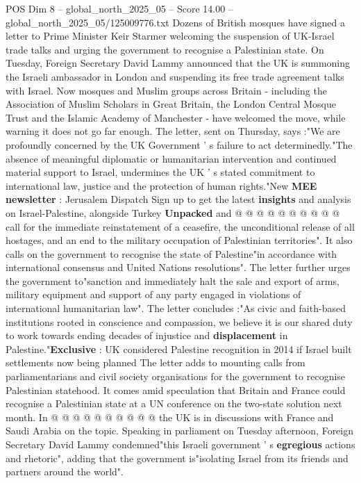 \begin{textsample}{POS Dim 8 – global\_north\_2025\_05 – Score 14.00 – global\_north\_2025\_05/125009776.txt}  \label{ex:f8_pos_033}
Dozens of British mosques have signed a letter to Prime Minister Keir Starmer welcoming the suspension of UK-Israel trade talks and urging the government to recognise a Palestinian state.
On Tuesday, Foreign Secretary David Lammy announced that the UK is summoning the Israeli ambassador in London and suspending its free trade agreement talks with Israel.
Now mosques and Muslim groups across Britain - including the Association of Muslim Scholars in Great Britain, the London Central Mosque Trust and the Islamic Academy of Manchester - have welcomed the move, while warning it does not go far enough.
The letter, sent on Thursday, says :"We are profoundly concerned by the UK Government ' s failure to act determinedly."The absence of meaningful diplomatic or humanitarian intervention and continued material support to Israel, undermines the UK ' s stated commitment to international law, justice and the protection of human rights."New \textbf{MEE} \textbf{newsletter} : Jerusalem Dispatch Sign up to get the latest \textbf{insights} and analysis on Israel-Palestine, alongside Turkey \textbf{Unpacked} and @ @ @ @ @ @ @ @ @ @ call for the immediate reinstatement of a ceasefire, the unconditional release of all hostages, and an end to the military occupation of Palestinian territories".
It also calls on the government to recognise the state of Palestine"in accordance with international consensus and United Nations resolutions".
The letter further urges the government to"sanction and immediately halt the sale and export of arms, military equipment and support of any party engaged in violations of international humanitarian law".
The letter concludes :"As civic and faith-based institutions rooted in conscience and compassion, we believe it is our shared duty to work towards ending decades of injustice and \textbf{displacement} in Palestine."\textbf{Exclusive} : UK considered Palestine recognition in 2014 if Israel built settlements now being planned The letter adds to mounting calls from parliamentarians and civil society organisations for the government to recognise Palestinian statehood.
It comes amid speculation that Britain and France could recognise a Palestinian state at a UN conference on the two-state solution next month.
In @ @ @ @ @ @ @ @ @ @ the UK is in discussions with France and Saudi Arabia on the topic.
Speaking in parliament on Tuesday afternoon, Foreign Secretary David Lammy condemned"this Israeli government ' s \textbf{egregious} actions and rhetoric", adding that the government is"isolating Israel from its friends and partners around the world".

\end{textsample}
